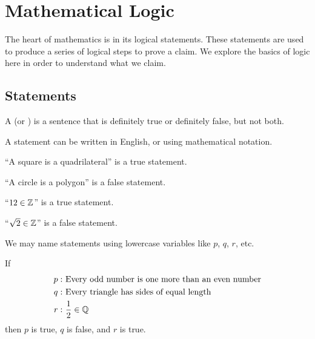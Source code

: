 \chapter{Mathematical Logic}
The heart of mathematics is in its logical statements. These statements are used to produce a series of logical steps to prove a claim. We explore the basics of logic here in order to understand what we claim.

\section{Statements}
\begin{definition}
    A  (or ) is a sentence that is definitely true or definitely false, but not both.
\end{definition}
\begin{remark}
    A statement can be written in English, or using mathematical notation.
\end{remark}

\begin{example}
    ``A square is a quadrilateral'' is a true statement.
\end{example}

\begin{example}
    ``A circle is a polygon'' is a false statement.
\end{example}

\begin{example}
    ``$12 \in \mathbb{Z}$'' is a true statement.
\end{example}

\begin{example}
    ``$\sqrt2 \in \mathbb{Z}$'' is a false statement.
\end{example}

We may name statements using lowercase variables like $p$, $q$, $r$, etc.
\begin{example}
    If
    \begin{align*}
        p: &\ \text{Every odd number is one more than an even number}\\
        q: &\ \text{Every triangle has sides of equal length}\\
        r: &\ \frac12 \in \mathbb{Q}
    \end{align*}
    then $p$ is true, $q$ is false, and $r$ is true.
\end{example}

